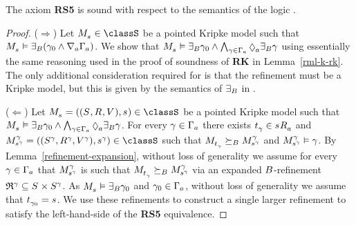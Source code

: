 \begin{lemma}\label{rml-s5-rs5}
The axiom {\bf RS5} is sound with respect to the semantics of the logic \logicRmlS{}.
\end{lemma}

\begin{proof}
($\Rightarrow$) 
Let $\kPModel{\kStateS} \in \classS$ be a pointed Kripke model such that $\kPModel{\kStateS} \entails \somerefsBs (\gamma_0 \land \coversA \Gamma_\agentA)$.
We show that $\kPModel{\kStateS} \entails \somerefsBs \gamma_0 \land \bigwedge_{\gamma \in \Gamma_\agentA} \possibleA \somerefsBs \gamma$ using essentially the same reasoning used in the proof of soundness of {\bf RK} in Lemma~\ref{rml-k-rk}.
The only additional consideration required for \logicRmlS{} is that the refinement must be a \classS{} Kripke model, but this is given by the semantics of $\somerefsBs$ in \logicRmlS{}.

($\Leftarrow$)
Let $\kPModelAndTuple{\kStateS} \in \classS$ be a pointed Kripke model such that $\kPModel{\kStateS} \entails \somerefsBs \gamma_0 \land \bigwedge_{\gamma \in \Gamma_\agentA} \possibleA \somerefsBs \gamma$.
For every $\gamma \in \Gamma_\agentA$ there exists $\kStateT_\gamma \in \kSuccessorsA{\kStateS}$ and $\kPModelAndTuple[\gamma]{\kStateS[\gamma]} \in \classS$ such that $\kPModel{\kStateT_\gamma} \simulatesBs \kPModel[\gamma]{\kStateS[\gamma]}$ and $\kPModel[\gamma]{\kStateS[\gamma]} \entails \gamma$.
By Lemma~\ref{refinement-expansion}, without loss of generality we assume for every $\gamma \in \Gamma_\agentA$ that $\kPModel[\gamma]{\kStateS[\gamma]}$ is such that $\kPModel{\kStateT_\gamma} \simulatesBs \kPModel[\gamma]{\kStateS[\gamma]}$ via an expanded $\agentsB$-refinement $\refinement^{\gamma} \subseteq \kStates \times \kStates[\gamma]$.
As $\kPModel{\kStateS} \entails \somerefsBs \gamma_0$ and $\gamma_0 \in \Gamma_\agentA$, without loss of generality we assume that $\kStateT_{\gamma_0} = \kStateS$.
We use these refinements to construct a single larger refinement to satisfy the left-hand-side of the {\bf RS5} equivalence.


\end{proof}
